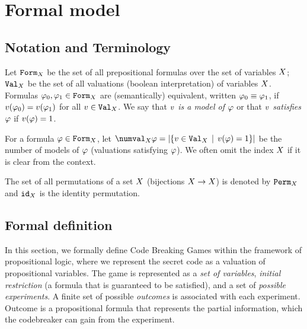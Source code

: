 \chapter{Formal model}

\section{Notation and Terminology}
Let $\mathtt{Form}_X$ be the set of all prepositional formulas over
  the set of variables $X$;
  $\mathtt{Val}_X$ be the set of all valuations (boolean interpretation)
  of variables $X$.
Formulas $\varphi_0, \varphi_1 \in \mathtt{Form}_X$ are (semantically) equivalent,
  written $\varphi_0 \equiv \varphi_1$, if
  $v(\varphi_0) = v(\varphi_1)$ for all $v\in\mathtt{Val}_X$.
We say that \emph{$v$ is a model of $\varphi$}
  or that \emph{$v$ satisfies $\varphi$}
  if $v(\varphi) = 1$.


For a formula $\varphi\in\mathtt{Form}_X$, let
  $\numval_\Var{\form} = |\{ \val\in\Val_\Var \| \val(\form) = 1 \}|$
  be the number of models of $\varphi$ (valuations satisfying $\varphi$).
We often omit the index $X$ if it is clear from the context.


The set of all permutations of a set $X$ (bijections $X->X$)
  is denoted by $\mathtt{Perm}_X$ and
  $\mathtt{id}_X$ is the identity permutation.

\section{Formal definition}


In this section, we formally define Code Breaking Games
  within the framework of propositional logic,
  where we represent the secret code as a valuation
  of propositional variables.
The game is represented as a \emph{set of variables},
  \emph{initial restriction} (a formula that is guaranteed to be satisfied),
  and a set of \emph{possible experiments}.
A finite set of possible \emph{outcomes} is associated with each experiment.
Outcome is a propositional formula that represents the partial information,
  which the codebreaker can gain from the experiment.

